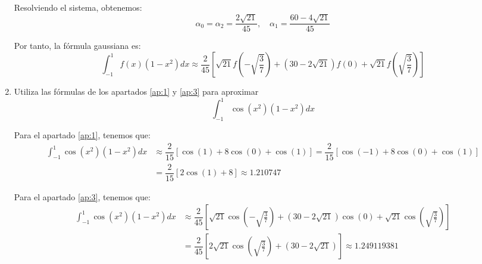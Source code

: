 \begin{ejercicio}
\begin{enumerate}
        Resolviendo el sistema, obtenemos:
        \begin{equation*}
            \alpha_0 = \alpha_2 = \dfrac{2\sqrt{21}}{45}, \quad \alpha_1 = \dfrac{60-4\sqrt{21}}{45}
        \end{equation*}

        Por tanto, la fórmula gaussiana es:
        \begin{equation*}
            \int_{-1}^{1} f(x)(1 - x^2)dx \approx \dfrac{2}{45}\left[\sqrt{21}f\left(-\sqrt{\frac{3}{7}}\right) + (30-2\sqrt{21})f(0) + \sqrt{21}f\left(\sqrt{\frac{3}{7}}\right)\right]
        \end{equation*}


        \item Utiliza las fórmulas de los apartados \ref{ap:1} y \ref{ap:3} para aproximar
        \begin{equation*}
            \int_{-1}^{1} \cos(x^2)(1 - x^2)dx
        \end{equation*}

        Para el apartado \ref{ap:1}, tenemos que:
        \begin{align*}
            \int_{-1}^{1} \cos(x^2)(1 - x^2)dx &\approx \dfrac{2}{15}\left[\cos(1) + 8\cos(0) + \cos(1)\right] = \dfrac{2}{15}\left[\cos(-1) + 8\cos(0) + \cos(1)\right]\\
            &= \dfrac{2}{15}\left[2\cos(1) + 8\right] \approx 1.210747
        \end{align*}

        Para el apartado \ref{ap:3}, tenemos que:
        \begin{align*}
            \int_{-1}^{1} \cos(x^2)(1 - x^2)dx &\approx \dfrac{2}{45}\left[\sqrt{21}\cos\left(-\sqrt{\frac{3}{7}}\right) + (30-2\sqrt{21})\cos(0) + \sqrt{21}\cos\left(\sqrt{\frac{3}{7}}\right)\right]\\
            &= \dfrac{2}{45}\left[2\sqrt{21}\cos\left(\sqrt{\frac{3}{7}}\right) + (30-2\sqrt{21})\right] \approx 1.249119381
        \end{align*}
    \end{enumerate}
\end{ejercicio}

